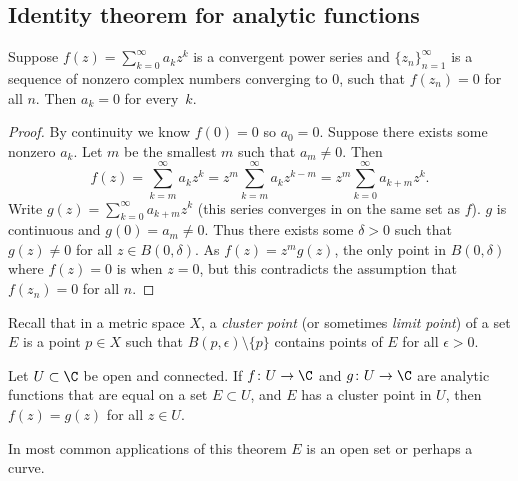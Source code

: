 \subsection{Identity theorem for analytic functions}

\begin{lemma}
Suppose $f(z) = \sum_{k=0}^\infty a_k z^k$ is a convergent power series and
$\{ z_n \}_{n=1}^\infty$ is a sequence of nonzero complex numbers converging to 0,
such that $f(z_n) = 0$ for all $n$.  Then $a_k = 0$ for every~$k$.
\end{lemma}

\begin{proof}
By continuity we know $f(0) = 0$ so $a_0 = 0$.
Suppose there exists some nonzero $a_k$.
Let $m$ be the smallest $m$ such that $a_m \not= 0$.  Then
\begin{equation*}
f(z) = \sum_{k=m}^\infty a_k z^k = 
z^m \sum_{k=m}^\infty a_k z^{k-m} =
z^m \sum_{k=0}^\infty a_{k+m} z^{k} .
\end{equation*}
Write $g(z) = \sum_{k=0}^\infty a_{k+m} z^{k}$ (this series converges in
on the same set as $f$).  $g$ is continuous and $g(0) = a_m \not= 0$.  Thus
there exists some $\delta > 0$ such that $g(z) \not= 0$ for all $z \in
B(0,\delta)$.  As $f(z) = z^m g(z)$, the only point in $B(0,\delta)$ where
$f(z) = 0$ is when $z=0$, but this contradicts the assumption
that $f(z_n) = 0$ for all $n$.
\end{proof}

Recall that in a metric space $X$, a \emph{cluster point}
(or sometimes \emph{limit point}) of a set
$E$ is a point $p \in X$ such that
$B(p,\epsilon) \setminus \{ p \}$ contains points of $E$
for all $\epsilon > 0$.

\begin{thm}
\label{thm:identityanalytic}%
%
Let $U \subset \C$ be open and connected.  If $f \colon U \to \C$
and $g \colon U \to \C$ are analytic functions that are
equal on a set $E \subset U$, and $E$ has a cluster point
in $U$, then $f(z) = g(z)$ for all $z \in U$.
\end{thm}

In most common applications of this theorem $E$ is an open set or perhaps a curve.

